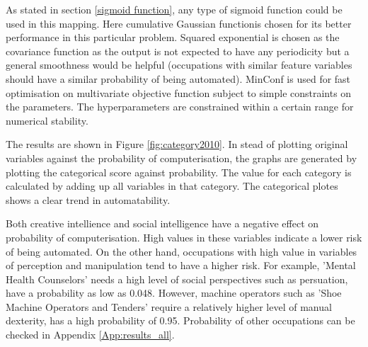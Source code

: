 \documentclass[11pt]{report}
\numberwithin{equation}{chapter}
\begin{document}
\begin{spacing}{2}
As stated in section \ref{sigmoid function}, any type of sigmoid function could be used in this mapping. Here cumulative Gaussian function\footnotemark is chosen for its better performance in this particular problem. Squared exponential is chosen as the covariance function as the output is not expected to have any periodicity but a general smoothness would be helpful (occupations with similar feature variables should have a similar probability of being automated). MinConf\cite{minConf} is used for fast optimisation on multivariate objective function subject to simple constraints on the parameters. The hyperparameters are constrained within a certain range for numerical stability. 



The results are shown in Figure \ref{fig:category2010}. In stead of plotting original variables against the probability of computerisation, the graphs are generated by plotting the categorical score against probability. The value for each category is calculated by adding up all variables in that category. The categorical plotes shows a clear trend in automatability. 

Both creative intellience and social intelligence have a negative effect on probability of computerisation. High values in these variables indicate a lower risk of being automated. On the other hand, occupations with high value in variables of perception and manipulation tend to have a higher risk. For example, 'Mental Health Counselors' needs a high level of social perspectives such as persuation, have a probability as low as 0.048. However, machine operators such as 'Shoe Machine Operators and Tenders' require a relatively higher level of manual dexterity, has a high probability of 0.95. Probability of other occupations can be checked in Appendix \ref{App:results_all}.


\end{spacing}
\end{document}
